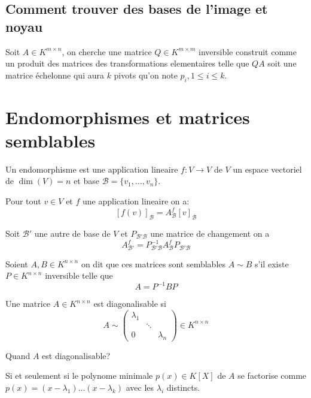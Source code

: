 \subsection{Comment trouver des bases de l'image et noyau}

\begin{definition}
Soit $A\in K^{m\times n}$, on cherche une matrice $Q\in K^{m\times m}$ inversible construit comme un produit des matrices des transformations elementaires telle que $QA$ soit une matrice échelonne qui aura $k$ pivots qu'on note $p_{i},1\leq i\leq k$. 
\end{definition}

\section{Endomorphismes et matrices semblables}

\begin{definition}[Endomorphisme]
Un endomorphisme est une application lineaire $f:V\to V$ de $V$ un espace vectoriel de $\dim(V)=n$ et base $\mathscr{B}=\{ v_{1},\dots,v_{n} \}$. 
\end{definition}
\begin{notation}
Pour tout $v\in V$ et $f$ une application lineaire on a:
$$
[f(v)]_{\mathscr{B}}=A_{\mathscr{B}}^{f}[v]_{\mathscr{B}}
$$
\end{notation}

Soit $\mathscr{B}'$ une autre de base de $V$ et $P_{\mathscr{B}'\mathscr{B}}$ une matrice de changement on a
$$
A^{f}_{\mathscr{B}'}=P_{\mathscr{B}'\mathscr{B}}^{-1}A_{\mathscr{B}}^{f}P_{\mathscr{B}'\mathscr{B}}
$$

\begin{definition}
Soient $A,B\in K^{n\times n}$ on dit que ces matrices sont semblables $A\sim B$ s'il existe $P\in K^{n\times n}$ inversible telle que 
$$
A=P^{-1}BP
$$
\end{definition}

Une matrice $A\in K^{n\times n}$ est diagonalisable si
$$
A\sim \begin{pmatrix}\lambda_{1} &  &   \\  & \ddots &  \\0  &  & \lambda _{n}\end{pmatrix}\in K^{n\times n}
$$
 
\begin{question}
    Quand $A$ est diagonalisable?
\end{question}
\begin{answer}
    Si et seulement si le polynome minimale $p(x)\in K[X]$ de $A$ se factorise comme $p(x)=(x-\lambda_{1})\dots(x-\lambda _{k})$ avec les $\lambda _{i}$ distincts.  
\end{answer}
